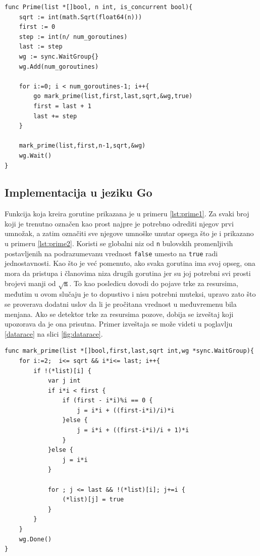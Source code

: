 \documentclass[12pt,oneside]{memoir}
\begin{document}
\begin{center}
\begin{lstlisting}[caption=Implementacija konkurentne funkcije za određivanje prostih brojeva manjih od n u jeziku Go,label={lst:prime1},backgroundcolor=\color{background}]
func Prime(list *[]bool, n int, is_concurrent bool){
	sqrt := int(math.Sqrt(float64(n)))
	first := 0
	step := int(n/ num_goroutines)
	last := step
	wg := sync.WaitGroup{}
	wg.Add(num_goroutines)

	for i:=0; i < num_goroutines-1; i++{
		go mark_prime(list,first,last,sqrt,&wg,true)
		first = last + 1
		last += step
	}

	mark_prime(list,first,n-1,sqrt,&wg)
	wg.Wait()
}
\end{lstlisting}
\end{center}

\subsection{Implementacija u jeziku Go}
Funkcija koja kreira gorutine prikazana je u primeru \ref{lst:prime1}. Za svaki broj koji je trenutno označen kao prost najpre je potrebno odrediti njegov prvi umnožak, a zatim označiti sve njegove umnoške unutar opsega što je i prikazano u primeru \ref{lst:prime2}. Koristi se globalni niz od \texttt{n} bulovskih promenljivih postavljenih na podrazumevanu vrednost \texttt{false} umesto na \texttt{true} radi jednostavnosti. Kao što je već pomenuto, ako svaka gorutina ima svoj opseg, ona mora da pristupa i članovima niza drugih gorutina jer su joj potrebni svi prosti brojevi manji od $\sqrt{\texttt{n}}$. To kao posledicu dovodi do pojave trke za resursima, međutim u ovom slučaju je to dopustivo i nisu potrebni muteksi, upravo zato što se proverava dodatni uslov da li je pročitana vrednost u međuvremenu bila menjana. Ako se detektor trke za resursima pozove, dobija se izveštaj koji upozorava da je ona prisutna. Primer izveštaja se može videti u poglavlju \ref{datarace} na slici \ref{fig:datarace}. 

\begin{center}
\begin{lstlisting}[caption=Implementacija konkurentne funkcije za označavanje prostih brojeva u jeziku Go,label={lst:prime2}, backgroundcolor=\color{background}]
func mark_prime(list *[]bool,first,last,sqrt int,wg *sync.WaitGroup){
	for i:=2;  i<= sqrt && i*i<= last; i++{
		if !(*list)[i] {
			var j int
			if i*i < first {
				if (first - i*i)%i == 0 {
					j = i*i + ((first-i*i)/i)*i
				}else {
					j = i*i + ((first-i*i)/i + 1)*i
				}
			}else {
				j = i*i
			}
		
			for ; j <= last && !(*list)[i]; j+=i {
				(*list)[j] = true
			}
		}
	}
	wg.Done()
}
\end{lstlisting}
\end{center}
\end{document}
